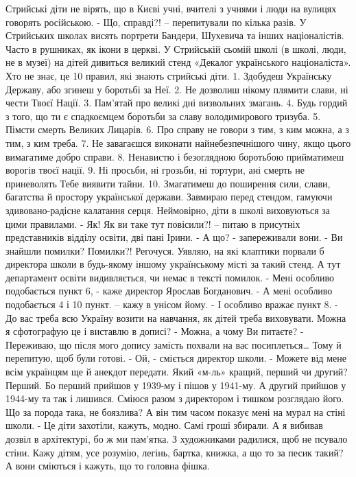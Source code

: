 Стрийські діти не вірять, що в Києві учні, вчителі з учнями і люди на вулицях говорять російською.  
- Що, справді?! – перепитували по кілька разів. 
У Стрийських школах висять портрети Бандери, Шухевича та інших націоналістів. Часто в рушниках, як ікони в церкві.
У Стрийській сьомій школі (в школі, люди, не в музеї) на дітей дивиться великий стенд  «Декалог українського націоналіста». Хто не знає, це 10 правил, які знають стрийські діти.
1. Здобудеш Українську Державу, або згинеш у боротьбі за Неї.
2. Не дозволиш нікому плямити слави, ні чести Твоєї Нації.
3. Пам’ятай про великі дні визвольних змагань.
4. Будь гордий з того, що ти є спадкоємцем боротьби за славу володимирового тризуба.
5. Пімсти смерть Великих Лицарів.
6. Про справу не говори з тим, з ким можна, а з тим, з ким треба.
7. Не завагаєшся виконати найнебезпечнішого чину, якщо цього вимагатиме добро справи.
8. Ненавистю і безоглядною боротьбою прийматимеш ворогів твоєї нації.
9. Ні просьби, ні грозьби, ні тортури, ані смерть не приневолять Тебе виявити тайни.
10. Змагатимеш до поширення сили, слави, багатства й простору української держави.
Завмираю перед стендом, гамуючи здивовано-радісне калатання серця. Неймовірно, діти в школі виховуються за цими правилами.
- Як! Як ви таке тут повісили?! – питаю в присутніх представників відділу освіти, дві пані Ірини.
- А що? - запереживали вони. - Ви знайшли помилки?
Помилки?! Регочуся. Уявляю, на які клаптики порвали б директора школи в будь-якому іншому українському місті за такий стенд. А тут департамент освіти видивляється, чи немає в тексті помилок. 
- Мені особливо подобається пункт 6, - каже директор Ярослав Богданович.
- А мені особливо подобається 4 і 10 пункт. – кажу в унісом йому. -  І особливо вражає пункт 8. - До вас треба всю Україну возити на навчання, як дітей треба виховувати. Можна я сфотографую це і виставлю в дописі?
- Можна, а чому Ви питаєте? 
- Переживаю, що після мого допису замість похвали на вас посиплеться… Тому й перепитую, щоб були готові.
- Ой, - сміється директор школи. - Можете від мене всім українцям ще й анекдот передати. 
Який «м-ль» кращий, перший чи другий? Перший. Бо перший прийшов у 1939-му і пішов у 1941-му. А другий прийшов у 1944-му та так і лишився.
Сміюся разом з директором і тишком розглядаю його.  Що за порода така, не боязлива? А він тим часом показує мені на мурал на стіні школи. 
- Це діти захотіли, кажуть, модно. Самі гроші збирали. А я вибивав дозвіл в архітектурі, бо ж ми пам’ятка. З художниками радилися, щоб не псувало стіни. Кажу дітям, усе розумію, легінь, бартка, книжка, а що то за песик такий? А вони сміються і кажуть, що то головна фішка.  
